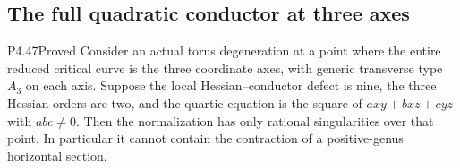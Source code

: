 \subsection{The full quadratic conductor at three axes}

\begin{statement}{P4.47}{Proved}
Consider an actual torus degeneration at a point where the
entire reduced critical curve is the three coordinate axes,
with generic transverse type $A_3$ on each axis. Suppose
the local Hessian--conductor defect is nine, the three
Hessian orders are two, and the quartic equation is the
square of $a xy+b xz+c yz$ with $abc\ne0$.
Then the normalization has only rational singularities
over that point. In particular it cannot contain the
contraction of a positive-genus horizontal section.
\end{statement}
